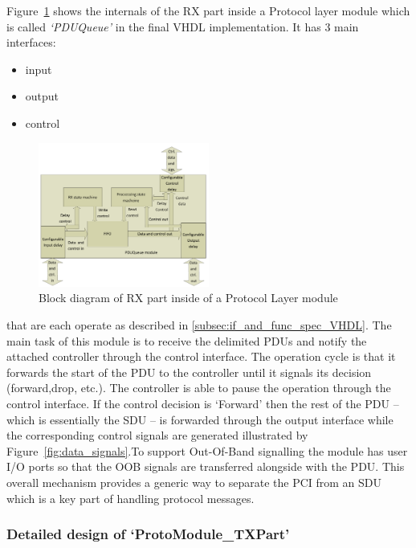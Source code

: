 \documentclass[conference]{IEEEtran}
\begin{document}
Figure~\ref{fig:proto_layer_rx_sch} shows the internals of the RX part inside a Protocol layer module which is called \emph{`PDUQueue'} in the final VHDL implementation. It has 3 main interfaces:
\begin{itemize}
\renewcommand \labelitemi{--}
\item input
\item output
\item control
\end{itemize}
\begin{figure}[!htb]
    \centering
    \includegraphics[width=0.5\textwidth]{figures_raw/pdu_queue_imp.pdf}
    \caption{Block diagram of RX part inside of a Protocol Layer module}
    \label{fig:proto_layer_rx_sch}
\end{figure}
that are each operate as described in \ref{subsec:if_and_func_spec_VHDL}. The main task of this module is to receive the delimited PDUs and notify the attached controller through the control interface. The operation cycle is that it forwards the start of the PDU to the controller until it signals its decision (forward,drop, etc.). The controller is able to pause the operation through the control interface. If the control decision is `Forward' then the rest of the PDU -- which is essentially the SDU -- is forwarded through the output interface while the corresponding control signals are generated illustrated by Figure~\ref{fig:data_signals}.To support Out-Of-Band signalling the module has user I/O ports so that the OOB signals are transferred alongside with the PDU. This overall mechanism provides a generic way to separate the PCI from an SDU which is a key part of handling protocol messages.

\subsubsection{Detailed design of `ProtoModule\_TXPart'}
\end{document}

